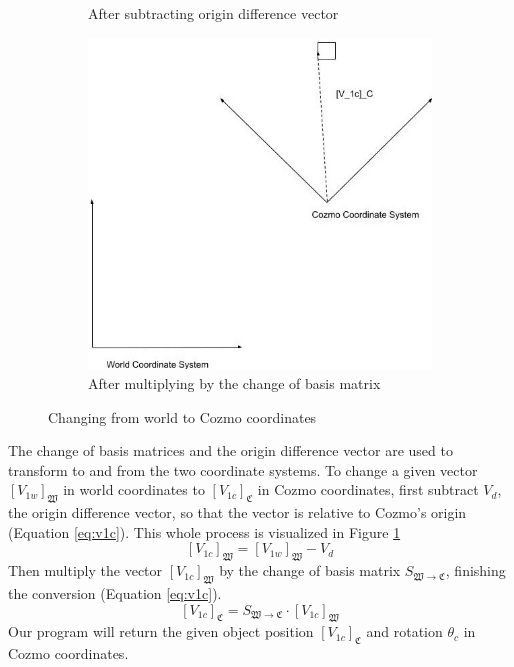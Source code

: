 \documentclass[jou,apacite]{apa6}
\begin{document}
\begin{figure}[h!]
\begin{subfigure}[b]{0.5\linewidth}
		\caption{After subtracting origin difference vector}
	\end{subfigure}
	\begin{subfigure}[b]{0.5\linewidth}
		\includegraphics[width=\linewidth]{wc3.jpg}
		\caption{After multiplying by the change of basis matrix}
	\end{subfigure}
	\caption{Changing from world to Cozmo coordinates}
	\label{fig:wtoc}
\end{figure}

The change of basis matrices and the origin difference vector are used to transform to and from the two coordinate systems. To change a given vector $[V_{1w}]_\mathfrak{W}$ in world coordinates to $[V_{1c}]_\mathfrak{C}$ in Cozmo coordinates, first subtract $V_d$, the origin difference vector, so that the vector is relative to Cozmo's origin (Equation \ref{eq:v1c}). This whole process is visualized in Figure \ref{fig:wtoc}
\begin{equation} \label{eq:v1c}
	[V_{1c}]_\mathfrak{W} =  [V_{1w}]_\mathfrak{W} - V_d
\end{equation}
Then multiply the vector $[V_{1c}]_\mathfrak{W}$ by the change of basis matrix $S_{\mathfrak{W}\rightarrow\mathfrak{C}}$, finishing the conversion (Equation \ref{eq:v1c}).
\begin{equation} \label{eq:v1c}
	[V_{1c}]_\mathfrak{C} =  S_{\mathfrak{W}\rightarrow\mathfrak{C}} \cdot [V_{1c}]_\mathfrak{W}
\end{equation}
Our program will return the given object position $[V_{1c}]_\mathfrak{C}$ and rotation $\theta_c$ in Cozmo coordinates.
\end{document}
